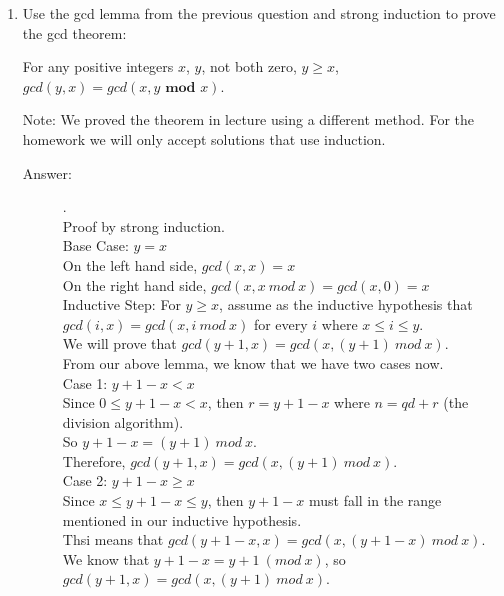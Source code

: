 \documentclass[12pt, oneside]{article}
\begin{document}
\begin{enumerate}
            \item Use the gcd lemma from the previous question and strong induction to prove the gcd theorem: 
            
            For any positive integers $x$, $y$, not both zero, $y \ge x$, $gcd(y, x) = gcd(x, y \textbf{ mod } x)$.
            
            Note: We proved the theorem in lecture using a different method. For the homework we will only accept solutions that use induction.
            
            \begin{description}
                \item[Answer:] .\\
                Proof by strong induction. \\
                Base Case: $y = x$ \\
                On the left hand side, $gcd(x,x) = x$\\
                On the right hand side, $gcd(x,x~mod~x) = gcd(x,0) = x$ \\

                Inductive Step: For $y \geq x$, assume as the inductive hypothesis that $gcd(i,x) = gcd(x, i~mod~x)$ for every $i$ where $x \leq i \leq y$. \\
                We will prove that $gcd(y+1,x) = gcd(x, (y+1)~mod~x)$. \\
                From our above lemma, we know that we have two cases now. \\

                Case 1: $y+1-x < x$\\
                Since $0 \leq y+1-x<x$, then $r=y+1-x$ where $n=qd+r$ (the division algorithm).\\
                So $y+1-x = (y+1)~mod~x$. \\
                Therefore, $gcd(y+1, x) = gcd(x,(y+1)~mod~x)$. \\

                Case 2: $y+1 - x \geq x$ \\
                Since $x \leq y+1-x \leq y$, then $y+1-x$ must fall in the range mentioned in our inductive hypothesis.\\
                Thsi means that $gcd(y+1-x,x) = gcd(x,(y+1-x)~mod~x)$.\\
                We know that $y+1-x = y+1 ~(mod~x)$, so $gcd(y+1,x) = gcd(x,(y+1)~mod~x)$.
            \end{description}


\end{enumerate}
\end{document}
